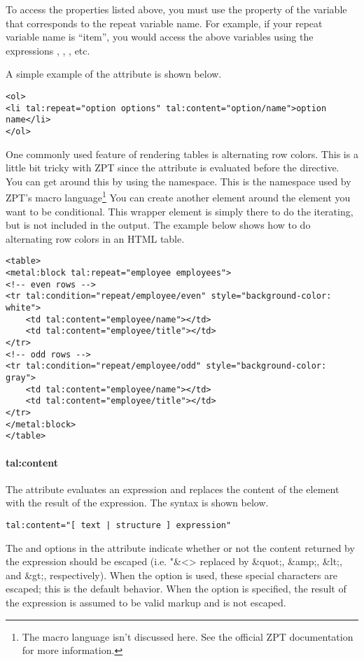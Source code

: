To access the properties listed above, you must use the property of 
the  variable that corresponds to the repeat variable name.
For example, if your repeat variable name is ``item'', you would access
the above variables using the expressions , 
, , etc.

A simple example of the  attribute is shown below.
\begin{verbatim}
<ol>
<li tal:repeat="option options" tal:content="option/name">option name</li>
</ol>
\end{verbatim}

One commonly used feature of rendering tables is alternating row colors.
This is a little bit tricky with ZPT since the 
attribute is evaluated before the  directive.  You
can get around this by using the  namespace.  This
is the namespace used by ZPT's macro language\footnote{The macro language
isn't discussed here.  See the official ZPT documentation for more 
information.}  You can create another element around the element you 
want to be conditional.  This wrapper element is simply there to do the 
iterating, but is not included in the output.  The example below shows
how to do alternating row colors in an HTML table.
\begin{verbatim}
<table>
<metal:block tal:repeat="employee employees">
<!-- even rows -->
<tr tal:condition="repeat/employee/even" style="background-color: white">
    <td tal:content="employee/name"></td>
    <td tal:content="employee/title"></td>
</tr>
<!-- odd rows -->
<tr tal:condition="repeat/employee/odd" style="background-color: gray">
    <td tal:content="employee/name"></td>
    <td tal:content="employee/title"></td>
</tr>
</metal:block>
</table>
\end{verbatim}


\paragraph{tal:content}

The  attribute evaluates an expression and replaces
the content of the element with the result of the expression.  The
syntax is shown below.
\begin{verbatim}
tal:content="[ text | structure ] expression"
\end{verbatim}

The  and  options in the 
attribute indicate whether or not the content returned by the 
expression should be escaped (i.e. "\&<> replaced by \&quot;, \&amp;, \&lt;,
and \&gt;, respectively).  When the  option is used, these
special characters are escaped; this is the default behavior.  When
the  option is specified, the result of the expression is
assumed to be valid markup and is not escaped.  

